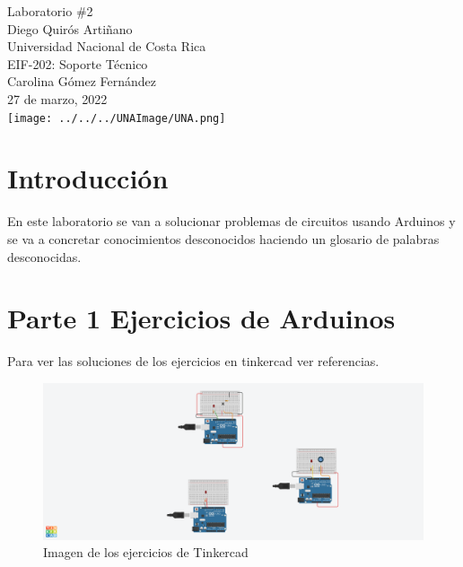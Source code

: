 \documentclass[stu, 12pt, letterpaper, donotrepeattitle, floatsintext, natbib, helv]{apa7}
\begin{document}
\begin{titlepage}
    \centering
    \vfill
    \LARGE Laboratorio \#2\\
    \vskip2cm
    \large Diego Quirós Artiñano \\
    Universidad Nacional de Costa Rica \\
    EIF-202: Soporte Técnico \\ 
    Carolina Gómez Fernández \\
    27 de marzo, 2022 \\
    \vfill
    \texttt{[image: ../../../UNAImage/UNA.png]} \\
    \vfill
    \vfill
\end{titlepage}

\renewcommand\contentsname{\largeÍndice}
\tableofcontents
\setcounter{tocdepth}{2}
\newpage
\renewcommand{\listfigurename}{\largeÍndice de fíguras}
\listoffigures
\newpage


\section{Introducción}
En este laboratorio se van a solucionar problemas de circuitos usando Arduinos y se va a concretar conocimientos desconocidos haciendo un glosario de palabras desconocidas.

\section{Parte 1 Ejercicios de Arduinos}
Para ver las soluciones de los ejercicios en tinkercad ver referencias. \cite{tinkercadEjercicios}

\begin{figure}[h]
    \centering
    \includegraphics[width=1\textwidth]{Lab2Exercises.png}
    \caption{Imagen de los ejercicios de Tinkercad}
    \label{fig:figArduinos}
\end{figure}
\end{document}
